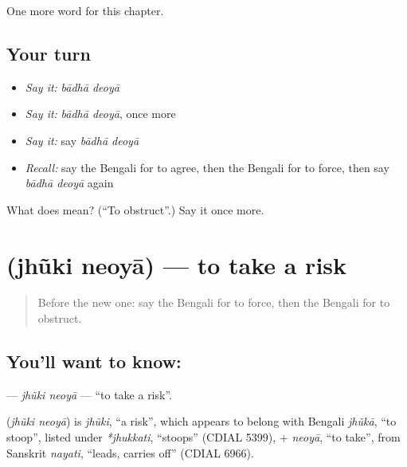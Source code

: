 \begin{grammarlens}[title={What you've built}]
One more word for this chapter.
\end{grammarlens}

\subsection*{Your turn}
\begin{itemize}
\raggedright
  \item \emph{Say it:} \emph{bādhā deoyā}
  \item \emph{Say it:} \emph{bādhā deoyā}, once more
  \item \emph{Say it:} say \emph{bādhā deoyā}
  \item \emph{Recall:} say the Bengali for to agree, then the Bengali for to force, then say \emph{bādhā deoyā} again
\end{itemize}

\begin{tcolorbox}[breakable,colback=teal!4,colframe=teal!35!black,title={Before you move on}]
What does   mean? (\textquotedblleft{}To obstruct\textquotedblright{}.) Say it once more.
\end{tcolorbox}
\section[\texorpdfstring{\bn{ঝুঁকি} \bn{নেওয়া} (jhũki neoyā)}{ঝুঁকি নেওয়া (jhũki neoyā)}]{  (jhũki neoyā) — to take a risk}

\label{lesson:BN-C184-jhuki-neoya}



\begin{quote}
Before the new one: say the Bengali for to force, then the Bengali for to obstruct.
\end{quote}

\subsection*{You'll want to know:  }
\textbf{ } — \emph{jhũki neoyā} — \textquotedblleft{}to take a risk\textquotedblright{}.

\begin{cousinweb}
\textbf{ } (\emph{jhũki neoyā}) is \emph{jhũki}, \textquotedblleft{}a risk\textquotedblright{}, which appears to belong with Bengali \emph{jhũkā}, \textquotedblleft{}to stoop\textquotedblright{}, listed under \emph{*jhukkati}, \textquotedblleft{}stoops\textquotedblright{} (CDIAL 5399), + \emph{neoyā}, \textquotedblleft{}to take\textquotedblright{}, from Sanskrit \emph{nayati}, \textquotedblleft{}leads, carries off\textquotedblright{} (CDIAL 6966).
\end{cousinweb}

